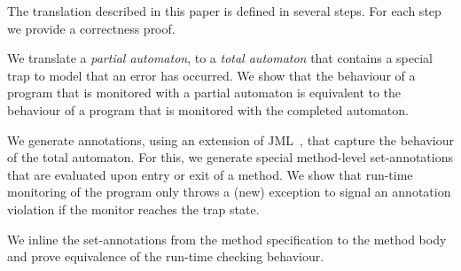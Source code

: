 
The translation described in this paper is defined in several
steps. For each step we provide a correctness proof.
\begin{inparaenum}
\item We translate a \emph{partial automaton}, to a \emph{total automaton}
that contains a special trap to model that an error has occurred.
%
We show that the behaviour of a program that is monitored with a partial
automaton is equivalent to the behaviour of a program that is monitored with
the completed automaton.
\item We generate annotations, using an extension of JML~\cite{LeavensPCCRCK05}, 
that capture the behaviour of the total automaton.  For this, we
generate special method-level set-annotations that are evaluated upon
entry or exit of a method.
We show that run-time monitoring of the program
only throws a (new) exception to signal an annotation violation if the
monitor reaches the trap state.
\item We inline the set-annotations from the method specification
to the method body and prove equivalence of the run-time checking behaviour.
\end{inparaenum}
